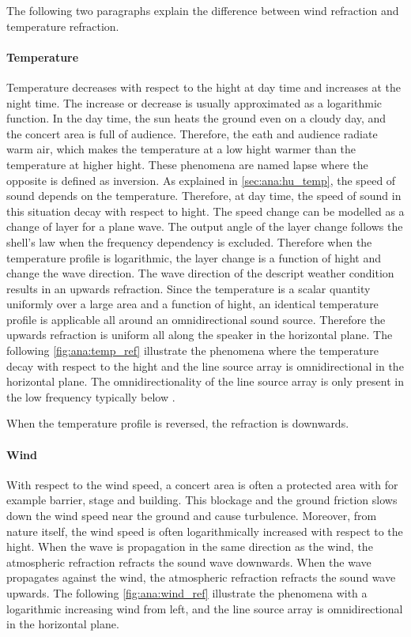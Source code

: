 The following two paragraphs explain the difference between wind refraction and temperature refraction.

\paragraph{Temperature} Temperature decreases with respect to the hight at day time and increases at the night time. The increase or decrease is usually approximated as a logarithmic function. In the day time, the sun heats the ground even on a cloudy day, and the concert area is full of audience. Therefore, the eath and audience radiate warm air, which makes the temperature at a low hight warmer than the temperature at higher hight. These phenomena are named lapse where the opposite is defined as inversion. As explained in \autoref{sec:ana:hu_temp}, the speed of sound depends on the temperature. Therefore, at day time, the speed of sound in this situation decay with respect to hight. The speed change can be modelled as a change of layer for a plane wave. The output angle of the layer change follows the shell's law when the frequency dependency is excluded. Therefore when the temperature profile is logarithmic, the layer change is a function of hight and change the wave direction. The wave direction of the descript weather condition results in an upwards refraction. Since the temperature is a scalar quantity uniformly over a large area and a function of hight, an identical temperature profile is applicable all around an omnidirectional sound source. Therefore the upwards refraction is uniform all along the speaker in the horizontal plane. The following \autoref{fig:ana:temp_ref} illustrate the phenomena where the temperature decay with respect to the hight and the line source array is omnidirectional in the horizontal plane. The omnidirectionality of the line source array is only present in the low frequency typically below .


When the temperature profile is reversed, the refraction is downwards. 
 

\paragraph{Wind} With respect to the wind speed, a concert area is often a protected area with for example barrier, stage and building. This blockage and the ground friction slows down the wind speed near the ground and cause turbulence. Moreover, from nature itself, the wind speed is often logarithmically increased with respect to the hight. When the wave is propagation in the same direction as the wind, the atmospheric refraction refracts the sound wave downwards. When the wave propagates against the wind, the atmospheric refraction refracts the sound wave upwards. The following \autoref{fig:ana:wind_ref}  illustrate the phenomena with a logarithmic increasing wind from left, and the line source array is omnidirectional in the horizontal plane.

